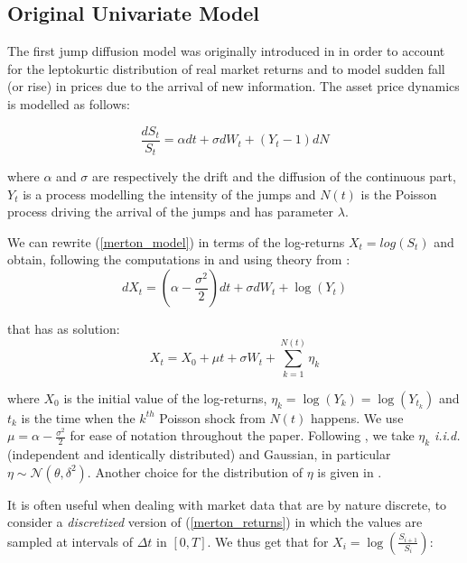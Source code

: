 \subsection{Original Univariate Model}
The first jump diffusion model was originally introduced in \cite{MERTON1976} in order to account for the leptokurtic distribution of real market returns and to model sudden fall (or rise) in prices due to the arrival of new information.
The asset price dynamics is modelled as follows:

\begin{equation}
\label{merton_model}
\frac{dS_t}{S_t} = \alpha dt + \sigma dW_t  + (Y_t-1)dN
\end{equation}

where $\alpha$ and $\sigma$ are respectively the drift and the diffusion of the continuous part, $Y_t$ is a process modelling the intensity of the jumps and $N(t)$ is the Poisson process driving the arrival of the jumps and has parameter $\lambda$.

We can rewrite (\ref{merton_model}) in terms of the log-returns $X_t = log(S_t)$ and obtain, following the computations in \cite{MARTIN2007} and using theory from \cite{TANKOV2015}:
\begin{equation}
dX_t = (\alpha - \frac{\sigma^2}{2})dt + \sigma dW_t + \log (Y_t)
\end{equation}

that has as solution:
\begin{equation}
\label{merton_returns}
X_t =X_0 +  \mu t + \sigma W_t + \sum_{k=1}^{N(t)} \eta_k
\end{equation}

where $X_0$ is the initial value of the log-returns, $\eta_k= \log(Y_k) = \log(Y_{t_k})$ and $t_k$ is the time when the $k^{th}$ Poisson shock from $N(t)$ happens. We use $\mu = \alpha - \frac{\sigma^2}{2} $ for ease of notation throughout the paper.
Following \cite{MERTON1976}, we take $\eta_k$ \textit{i.i.d.} (independent and identically distributed) and Gaussian, in particular $\eta \sim \mathcal{N}(\theta, \delta^2)$.
Another choice for the distribution of $\eta$ is given in \cite{KOU2002}. 


It is often useful when dealing with market data that are by nature discrete, to consider a \textit{discretized} version of (\ref{merton_returns}) in which the values are sampled at intervals of $\Delta t$ in $[0, T]$. We thus get that for $X_i = \log(\frac{S_{i+1}}{S_i})$:

